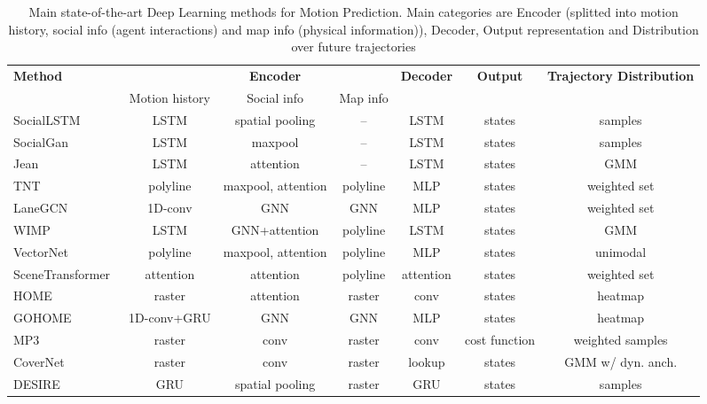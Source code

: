 \begin{table}[h!]
	\centering
	\caption[Main state-of-the-art Deep Learning methods for Motion Prediction]{Main state-of-the-art Deep Learning methods for Motion Prediction. Main categories are Encoder (splitted into motion history, social info (agent interactions) and map info (physical information)), Decoder, Output representation and Distribution over future trajectories}
	\begin{adjustbox}{max width=\textwidth}
		\begin{tabular}{l |ccc|c|c|c}
			\textbf{Method}	&	& \textbf{Encoder}	&	& \textbf{Decoder}	& \textbf{Output}  & \textbf{Trajectory Distribution}	\\
			& Motion history	& Social info	& Map info	&	&	&	\\
			\midrule
			\midrule
			SocialLSTM~\cite{alahi2016social}	& LSTM	& spatial pooling	& --	& LSTM	& states	& samples	\\
			SocialGan~\cite{gupta2018social}	& LSTM	& maxpool	& --	& LSTM	& states	& samples	\\
			Jean~\cite{mercat2020multi}	& LSTM	& attention	& --	& LSTM	& states	& GMM	\\
			TNT~\cite{zhao2021tnt}	& polyline	& maxpool, attention	& polyline	& MLP	& states	& weighted set	\\
			LaneGCN~\cite{liang2020learning}	& 1D-conv	& GNN	& GNN	& MLP	& states	& weighted set	\\
			WIMP~\cite{khandelwal2020if}	& LSTM	& GNN+attention	& polyline	& LSTM	& states	& GMM	\\
			VectorNet~\cite{gao2020vectornet}	& polyline	& maxpool, attention	& polyline	& MLP	& states	& unimodal	\\
			SceneTransformer~\cite{ngiam2022scene}	& attention	& attention	& polyline	& attention	& states	& weighted set	\\
			HOME~\cite{gilles2021home}	& raster	& attention	& raster	& conv	& states	& heatmap	\\
			GOHOME~\cite{gilles2022gohome}	& 1D-conv+GRU	& GNN	& GNN	& MLP	& states	& heatmap	\\
			MP3~\cite{casas2021mp3}	& raster	& conv	& raster	& conv	& cost function	& weighted samples	\\
			CoverNet~\cite{phan2020covernet}	& raster	& conv	& raster	& lookup	& states	& GMM w/ dyn. anch.	\\
			DESIRE~\cite{lee2017desire}	& GRU	& spatial pooling	& raster	& GRU	& states	& samples	\\

\end{tabular}
\end{adjustbox}
\end{table}
